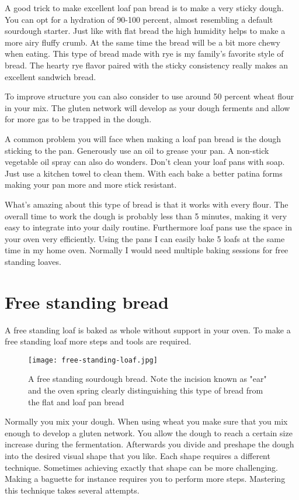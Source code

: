 A good trick to make excellent loaf pan bread is to make a very
sticky dough. You can opt for a hydration of 90-100 percent, almost
resembling a default sourdough starter. Just like with flat bread
the high humidity helps to make a more airy fluffy crumb. At
the same time the bread will be a bit more chewy when eating. This
type of bread made with rye is my family's favorite style of bread.
The hearty rye flavor paired with the sticky consistency really
makes an excellent sandwich bread.

To improve structure you can also consider to use around 50 percent
wheat flour in your mix. The gluten network will develop as your
dough ferments and allow for more gas to be trapped in the dough.

A common problem you will face when making a loaf pan bread is
the dough sticking to the pan. Generously use an oil to grease
your pan. A non-stick vegetable oil spray can also do wonders.
Don't clean your loaf pans with soap. Just use a kitchen towel
to clean them. With each bake a better patina forms making your
pan more and more stick resistant.

What's amazing about this type of bread is that it works
with every flour. The overall time to work the dough is probably
less than 5 minutes, making it very easy to integrate
into your daily routine. Furthermore loaf pans use the space
in your oven very efficiently. Using the pans I can
easily bake 5 loafs at the same time in my home oven.
Normally I would need multiple baking sessions for
free standing loaves.

\section{Free standing bread}

A free standing loaf is baked as whole without support
in your oven. To make a free standing loaf more steps
and tools are required.

\begin{figure}[!htb]
  \texttt{[image: free-standing-loaf.jpg]}
  \centering
  \caption{A free standing sourdough bread. Note the incision known as "ear" and the oven spring clearly
  distinguishing this type of bread from the flat and loaf pan bread}
\end{figure}

Normally you mix your dough. When using wheat you make sure
that you mix enough to develop a gluten network.
You allow the dough to reach
a certain size increase during the fermentation. Afterwards you divide and preshape
the dough into the desired visual shape that you like.
Each shape requires a different technique. Sometimes achieving
exactly that shape can be more challenging. Making a baguette
for instance requires you to perform more steps. Mastering this
technique takes several attempts.

